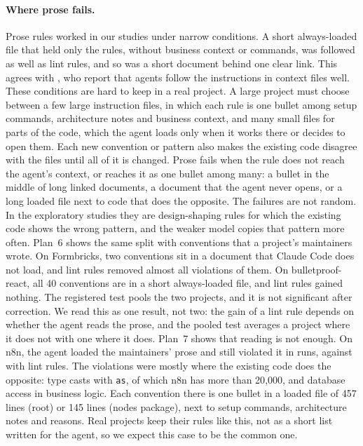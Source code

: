 \documentclass[pdflatex,sn-basic]{sn-jnl}
\begin{document}
\paragraph{Where prose fails.}
Prose rules worked in our studies under narrow conditions.
A short always-loaded file that held only the rules, without business context or commands, was followed as well as lint rules, and so was a short document behind one clear link.
This agrees with \citet{gloaguen2026agentsmd}, who report that agents follow the instructions in context files well.
These conditions are hard to keep in a real project.
A large project must choose between a few large instruction files, in which each rule is one bullet among setup commands, architecture notes and business context, and many small files for parts of the code, which the agent loads only when it works there or decides to open them.
Each new convention or pattern also makes the existing code disagree with the files until all of it is changed.
Prose fails when the rule does not reach the agent's context, or reaches it as one bullet among many: a bullet in the middle of long linked documents, a document that the agent never opens, or a long loaded file next to code that does the opposite.
The failures are not random.
In the exploratory studies they are design-shaping rules for which the existing code shows the wrong pattern, and the weaker model copies that pattern more often.
Plan~6 shows the same split with conventions that a project's maintainers wrote.
On Formbricks, two conventions sit in a document that Claude Code does not load, and lint rules removed almost all violations of them.
On bulletproof-react, all 40 conventions are in a short always-loaded file, and lint rules gained nothing.
The registered test pools the two projects, and it is not significant after correction.
We read this as one result, not two: the gain of a lint rule depends on whether the agent reads the prose, and the pooled test averages a project where it does not with one where it does.
Plan~7 shows that reading is not enough.
On n8n, the agent loaded the maintainers' prose and still violated it in \HSixteenProse{} runs, against \HSixteenRules{} with lint rules.
The violations were mostly where the existing code does the opposite: type casts with \texttt{as}, of which n8n has more than 20{,}000, and database access in business logic.
Each convention there is one bullet in a loaded file of 457 lines (root) or 145 lines (nodes package), next to setup commands, architecture notes and reasons.
Real projects keep their rules like this, not as a short list written for the agent, so we expect this case to be the common one.
\end{document}
